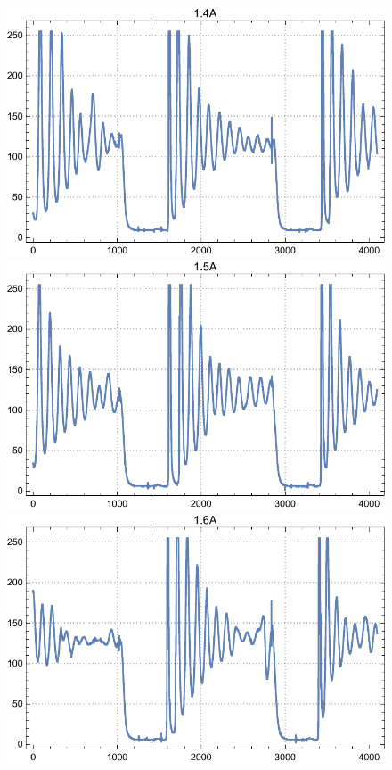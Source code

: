 \documentclass[a4paper, 12pt]{article}
\begin{document}
\begin{enumerate}
\begin{figure}[h]
			\endminipage\hfill
			\includegraphics[width=\linewidth]{1.4A.pdf}
			\endminipage\hfill
			\includegraphics[width=\linewidth]{1.5A.pdf}
			\endminipage\hfill
			\includegraphics[width=\linewidth]{1.6A.pdf}

\end{figure}
\end{enumerate}
\end{document}
